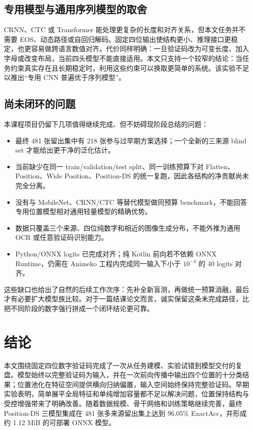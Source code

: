 \documentclass[UTF8,12pt,a4paper]{ctexart}
\begin{document}
\subsection{专用模型与通用序列模型的取舍}

CRNN、CTC 或 Transformer 能处理更复杂的长度和对齐关系，但本文任务并不需要 EOS、动态路径或自回归解码。固定四位输出使结构更小、推理接口更稳定，也更容易做跨语言数值对齐。代价同样明确：一旦验证码改为可变长度、加入字母或改变布局，当前四头模型不能直接适用。本文只支持一个较窄的结论：当任务约束真实存在且长期稳定时，利用这些约束可以换取更简单的系统。该实验不足以推出“专用 CNN 普遍优于序列模型”。

\subsection{尚未闭环的问题}

本课程项目仍留下几项值得继续完成、但不妨碍现阶段总结的问题：

\begin{itemize}
  \item 最终 481 张留出集中有 218 张参与过早期方案选择；一个全新的三来源 blind set 才能给出更干净的泛化估计。
  \item 当前缺少在同一 train/validation/test split、同一训练预算下对 Flatten、Position、Wide Position、Position-DS 的统一复跑，因此各结构的净贡献尚未完全分离。
  \item 没有与 MobileNet、CRNN/CTC 等替代模型做同预算 benchmark，不能回答专用位置模型相对通用轻量模型的精确优势。
  \item 数据只覆盖三个来源、四位纯数字和相近的图像生成分布，不能外推为通用 OCR 或任意验证码识别能力。
  \item Python/ONNX logits 已完成对齐；纯 Kotlin 前向若不依赖 ONNX Runtime，仍需在 Animeko 工程内完成同一输入下小于 $10^{-4}$ 的 40 logits 对齐。
\end{itemize}

这些缺口也给出了自然的后续工作次序：先补全新盲测，再做统一预算消融，最后才有必要扩大模型族比较。对于一篇结课论文而言，诚实保留这条未完成路径，比把不同阶段的数字强行拼成一个闭环结论更可靠。

\section{结论}

本文围绕固定四位数字验证码完成了一次从任务建模、实验试错到模型交付的复盘。模型始终以完整验证码为输入，并在一次前向传播中输出四个位置的十分类结果；位置池化在特征空间提供横向归纳偏置，输入空间始终保持完整验证码。早期实验表明，简单展平全局特征和单纯增加容量都不足以解决问题，位置保持结构与受控增强带来了明确改善。随着数据规模、骨干网络和训练策略继续完善，最终 Position-DS 三模型集成在 481 张多来源留出集上达到 96.05\% ExactAcc，并形成约 1.12 MiB 的可部署 ONNX 模型。
\end{document}
